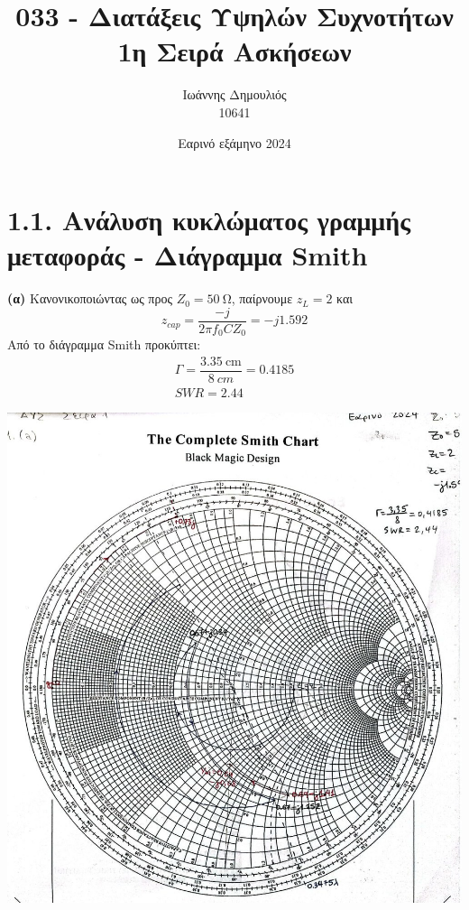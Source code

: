 \documentclass[12pt]{article}
\title{\vspace{-2cm}033 - Διατάξεις Υψηλών Συχνοτήτων \\ 
        \large 1η Σειρά Ασκήσεων}
\author{Ιωάννης Δημουλιός \\ 
        \large 10641}
\date{Εαρινό εξάμηνο 2024}
\begin{document}
\maketitle
\section*{1.1. Ανάλυση κυκλώματος γραμμής μεταφοράς - Διάγραμμα Smith}
\textbf{(α)} Κανονικοποιώντας ως προς \(Z_0 = \SI{50}{\ohm}\), παίρνουμε \(z_L = 2\) και 
\[
z_{cap} = \dfrac{-j}{2\pi f_0 C Z_0} = -j1.592
\]
Από το διάγραμμα Smith προκύπτει: 
\begin{gather*}
    \Gamma = \dfrac{\SI{3.35}{\cm}}{\SI{8}{cm}} = 0.4185 \\
    SWR = 2.44
\end{gather*}
\begin{center}
    \includegraphics*[scale=0.5]{1-1-a.jpg}
\end{center}
\end{document}
